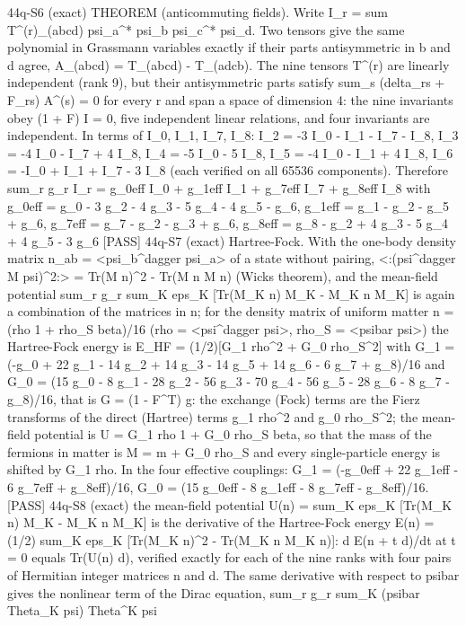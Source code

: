 \documentclass[
  10pt,
]{article}
\newenvironment{Shaded}{}{}
\newcommand{\NormalTok}[1]{#1}
\begin{document}
\begin{Shaded}
\begin{Highlighting}[]
\NormalTok{[PASS] 44q{-}S6  (exact) THEOREM (anticommuting fields). Write I\_r = sum T\^{}(r)\_(abcd) psi\_a\^{}* psi\_b psi\_c\^{}* psi\_d. Two tensors give the same polynomial in Grassmann variables exactly if their parts antisymmetric in b and d agree, A\_(abcd) = T\_(abcd) {-} T\_(adcb). The nine tensors T\^{}(r) are linearly independent (rank 9), but their antisymmetric parts satisfy sum\_s (delta\_rs + F\_rs) A\^{}(s) = 0 for every r and span a space of dimension 4: the nine invariants obey (1 + F) I = 0, five independent linear relations, and four invariants are independent. In terms of I\_0, I\_1, I\_7, I\_8: I\_2 = {-}3 I\_0 {-} I\_1 {-} I\_7 {-} I\_8, I\_3 = {-}4 I\_0 {-} I\_7 + 4 I\_8, I\_4 = {-}5 I\_0 {-} 5 I\_8, I\_5 = {-}4 I\_0 {-} I\_1 + 4 I\_8, I\_6 = {-}I\_0 + I\_1 + I\_7 {-} 3 I\_8 (each verified on all 65536 components). Therefore sum\_r g\_r I\_r = g\_0eff I\_0 + g\_1eff I\_1 + g\_7eff I\_7 + g\_8eff I\_8 with g\_0eff = g\_0 {-} 3 g\_2 {-} 4 g\_3 {-} 5 g\_4 {-} 4 g\_5 {-} g\_6, g\_1eff = g\_1 {-} g\_2 {-} g\_5 + g\_6, g\_7eff = g\_7 {-} g\_2 {-} g\_3 + g\_6, g\_8eff = g\_8 {-} g\_2 + 4 g\_3 {-} 5 g\_4 + 4 g\_5 {-} 3 g\_6}
\NormalTok{[PASS] 44q{-}S7  (exact) Hartree{-}Fock. With the one{-}body density matrix n\_ab = \textless{}psi\_b\^{}dagger psi\_a\textgreater{} of a state without pairing, \textless{}:(psi\^{}dagger M psi)\^{}2:\textgreater{} = Tr(M n)\^{}2 {-} Tr(M n M n) (Wick\textquotesingle{}s theorem), and the mean{-}field potential sum\_r g\_r sum\_K eps\_K [Tr(M\_K n) M\_K {-} M\_K n M\_K] is again a combination of the matrices in n; for the density matrix of uniform matter n = (rho 1 + rho\_S beta)/16 (rho = \textless{}psi\^{}dagger psi\textgreater{}, rho\_S = \textless{}psibar psi\textgreater{}) the Hartree{-}Fock energy is E\_HF = (1/2)[G\_1 rho\^{}2 + G\_0 rho\_S\^{}2] with G\_1 = ({-}g\_0 + 22 g\_1 {-} 14 g\_2 + 14 g\_3 {-} 14 g\_5 + 14 g\_6 {-} 6 g\_7 + g\_8)/16 and G\_0 = (15 g\_0 {-} 8 g\_1 {-} 28 g\_2 {-} 56 g\_3 {-} 70 g\_4 {-} 56 g\_5 {-} 28 g\_6 {-} 8 g\_7 {-} g\_8)/16, that is G = (1 {-} F\^{}T) g: the exchange (Fock) terms are the Fierz transforms of the direct (Hartree) terms g\_1 rho\^{}2 and g\_0 rho\_S\^{}2; the mean{-}field potential is U = G\_1 rho 1 + G\_0 rho\_S beta, so that the mass of the fermions in matter is M = m + G\_0 rho\_S and every single{-}particle energy is shifted by G\_1 rho. In the four effective couplings: G\_1 = ({-}g\_0eff + 22 g\_1eff {-} 6 g\_7eff + g\_8eff)/16, G\_0 = (15 g\_0eff {-} 8 g\_1eff {-} 8 g\_7eff {-} g\_8eff)/16.}
\NormalTok{[PASS] 44q{-}S8  (exact) the mean{-}field potential U(n) = sum\_K eps\_K [Tr(M\_K n) M\_K {-} M\_K n M\_K] is the derivative of the Hartree{-}Fock energy E(n) = (1/2) sum\_K eps\_K [Tr(M\_K n)\^{}2 {-} Tr(M\_K n M\_K n)]: d E(n + t d)/dt at t = 0 equals Tr(U(n) d), verified exactly for each of the nine ranks with four pairs of Hermitian integer matrices n and d. The same derivative with respect to psibar gives the nonlinear term of the Dirac equation, sum\_r g\_r sum\_K (psibar Theta\_K psi) Theta\^{}K psi}

\end{Highlighting}
\end{Shaded}
\end{document}
